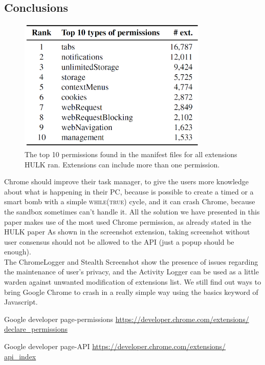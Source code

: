 \documentclass[12pt]{article}
\begin{document}
\begin{multicols}{2}
\section*{Conclusions}
\begin{figure}[H]
	\begin{center}
		\includegraphics[width=9cm]{permission.png}
		\caption{The top 10 permissions found in the manifest
			files for all extensions HULK ran. Extensions can include			
			more than one permission.}
	\end{center}
\end{figure}
Chrome should improve their task manager, to give the users more knowledge about what is happening in their PC, because is possible to create a timed or a smart bomb with a simple \textsc{while(true)} cycle, and it can crash Chrome, because the sandbox sometimes can't handle it.
All the solution we have presented in this paper makes use of the most used Chrome permission, as already stated in the HULK paper \cite{HULK}
As shown in the screenshot extension, taking screenshot without user consensus should not be allowed to the API (just a popup should be enough). \\
The ChromeLogger and Stealth Screenshot show the presence of issues regarding the maintenance of user's privacy, and the Activity Logger can be used as a little warden against unwanted modification of extensions list. We still find out ways to bring Google Chrome to crash in a really simple way using the basics keyword of Javascript.

\begin{thebibliography}{8}
	Google developer page-permissions
	\href{https://developer.chrome.com/extensions/declare_permissions}{https://developer.chrome.com/extensions/\\declare\_permissions}
	
	Google developer page-API
	\href{https://developer.chrome.com/extensions/api_index}{https://developer.chrome.com/extensions/\\api\_index}
	

\end{thebibliography}
\end{multicols}
\end{document}
